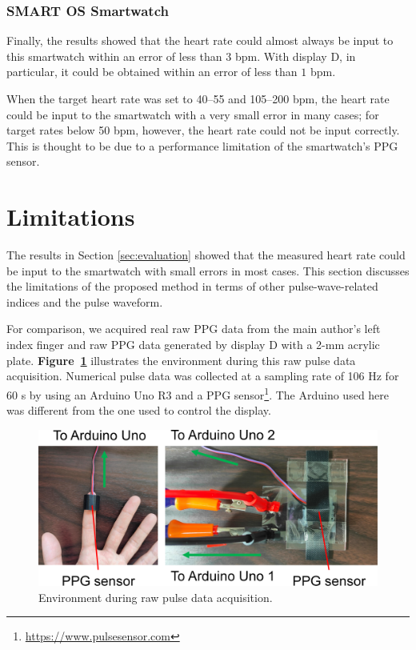 \documentclass{ieeeaccess}
\newcommand\figref[1]{\textbf{Figure~\ref{fig:#1}}}
\begin{document}
\subsubsection{SMART OS Smartwatch}
Finally, the results showed that the heart rate could almost always be input to this smartwatch within an error of less than $3$ bpm. With display D, in particular, it could be obtained within an error of less than $1$ bpm.\par

When the target heart rate was set to 40--55 and 105--200 bpm, the heart rate could be input to the smartwatch with a very small error in many cases; for target rates below 50 bpm, however, the heart rate could not be input correctly. This is thought to be due to a performance limitation of the smartwatch's PPG sensor.



\section{Limitations}
\label{sec:limitation}
The results in Section \ref{sec:evaluation} showed that the measured heart rate could be input to the smartwatch with small errors in most cases. This section discusses the limitations of the proposed method in terms of other pulse-wave-related indices and the pulse waveform.\par

For comparison, we acquired real raw PPG data from the main author's left index finger and raw PPG data generated by display D with a 2-mm acrylic plate. \figref{raw_data_acquisition} illustrates the environment during this raw pulse data acquisition. Numerical pulse data was collected at a sampling rate of 106 Hz for 60 s by using an Arduino Uno R3 and a PPG sensor\footnote{\url{https://www.pulsesensor.com}}. The Arduino used here was different from the one used to control the display.

\begin{figure}[!t]
  \centering
  \includegraphics[width=1\linewidth]{figures/raw_data_acquisition.eps}
  \caption{Environment during raw pulse data acquisition.}
  \label{fig:raw_data_acquisition}
\end{figure}
\end{document}
